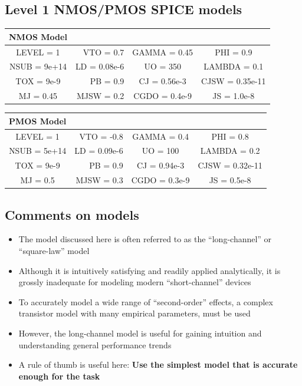 \documentclass[11pt]{article}
\providecommand{\tightlist}{%
      \setlength{\itemsep}{0pt}\setlength{\parskip}{0pt}}
\begin{document}
    \hypertarget{level-1-nmospmos-spice-models}{%
\subsection{Level 1 NMOS/PMOS SPICE
models}\label{level-1-nmospmos-spice-models}}

    \begin{longtable}[]{@{}crcc@{}}
\toprule
NMOS Model & & &\tabularnewline
\midrule
\endhead
LEVEL = 1 & VTO = 0.7 & GAMMA = 0.45 & PHI = 0.9\tabularnewline
NSUB = 9e+14 & LD = 0.08e-6 & UO = 350 & LAMBDA = 0.1\tabularnewline
TOX = 9e-9 & PB = 0.9 & CJ = 0.56e-3 & CJSW = 0.35e-11\tabularnewline
MJ = 0.45 & MJSW = 0.2 & CGDO = 0.4e-9 & JS = 1.0e-8\tabularnewline
\bottomrule
\end{longtable}

\begin{longtable}[]{@{}crcc@{}}
\toprule
PMOS Model & & &\tabularnewline
\midrule
\endhead
LEVEL = 1 & VTO = -0.8 & GAMMA = 0.4 & PHI = 0.8\tabularnewline
NSUB = 5e+14 & LD = 0.09e-6 & UO = 100 & LAMBDA = 0.2\tabularnewline
TOX = 9e-9 & PB = 0.9 & CJ = 0.94e-3 & CJSW = 0.32e-11\tabularnewline
MJ = 0.5 & MJSW = 0.3 & CGDO = 0.3e-9 & JS = 0.5e-8\tabularnewline
\bottomrule
\end{longtable}

    \hypertarget{comments-on-models}{%
\subsection{Comments on models}\label{comments-on-models}}

    \begin{itemize}
\tightlist
\item
  The model discussed here is often referred to as the ``long-channel''
  or ``square-law'' model
\item
  Although it is intuitively satisfying and readily applied
  analytically, it is grossly inadequate for modeling modern
  ``short-channel'' devices
\item
  To accurately model a wide range of ``second-order'' effects, a
  complex transistor model with many empirical parameters, must be used
\item
  However, the long-channel model is useful for gaining intuition and
  understanding general performance trends
\item
  A rule of thumb is useful here: \textbf{Use the simplest model that is
  accurate enough for the task}
\end{itemize}
\end{document}

